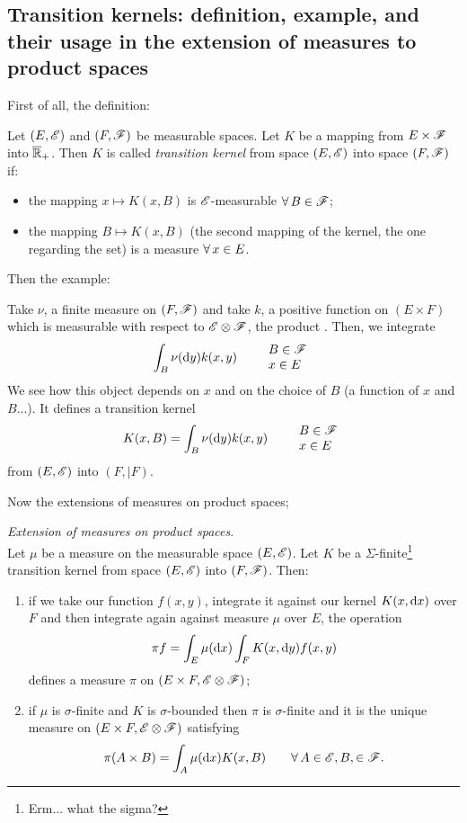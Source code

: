 \documentclass{report}
\begin{document}
\subsection{Transition kernels: definition, example, and their usage in the extension of measures to
product spaces}
First of all, the definition:
\begin{definition}
	Let $(E,\mathscr{E})$ and $(F,\mathscr{F})$ be measurable spaces. Let $K$ be a mapping from $E\times\mathscr{F}$ into $\overline{\mathbb{R}}_+$. Then $K$ is called \emph{transition kernel} from space $(E,\mathscr{E})$ into space $(F,\mathscr{F})$ if:
	\begin{itemize}
		\item the mapping $x\mapsto K(x,B)$ is $\mathscr{E}$-measurable $\forall\, B\in\mathscr{F}$;
		\item the mapping $B\mapsto K(x,B)$ (the second mapping of the kernel, the one regarding the set) is a measure $\forall\, x\in E$.
	\end{itemize}
\end{definition}
Then the example:
\begin{example}
	Take $\nu$, a finite measure on $(F,\mathscr{F})$ and take $k$, a positive function on $(E\times F)$ which is measurable with respect to $\mathscr{E}\otimes\mathscr{F}$, the product \sa{}. Then, we integrate
	\[\int_B\nu(\mathop{}\!\mathrm{d} y)k(x,y)\qquad\begin{array}{l}
		B\in\mathscr{F}\\
		x\in E
	\end{array}\]
	We see how this object depends on $x$ and on the choice of $B$ (a function of $x$ and $B$...). It defines a transition kernel
	\[K(x,B)=\int_B\nu(\mathop{}\!\mathrm{d} y)k(x,y)\qquad\begin{array}{l}
		B\in\mathscr{F}\\
		x\in E
	\end{array}\]
	from $(E,\mathscr{E})$ into $(F,|F)$.
\end{example}
Now the extensions of measures on product spaces;
\begin{theorem}
		\emph{Extension of measures on product spaces}.\\
	Let $\mu$ be a measure on the measurable space $(E,\mathscr{E})$. Let $K$ be a $\Sigma$-finite\footnote{Erm... what the sigma?} transition kernel from space $(E,\mathscr{E})$ into $(F,\mathscr{F})$. Then:
	\begin{enumerate}[\circnum]
		\item if we take our function $f(x,y)$, integrate it against our kernel $K(x,\mathop{}\!\mathrm{d} x)$ over $F$ and then integrate again against measure $\mu$ over $E$, the operation 
		\[\pi f=\int_E\mu(\mathop{}\!\mathrm{d} x)\int_FK(x,\mathop{}\!\mathrm{d} y)f(x,y)\]
		defines a measure $\pi$ on $(E\times F,\mathscr{E}\otimes\mathscr{F})$;
		\item if $\mu$ is $\sigma$-finite and $K$ is $\sigma$-bounded then $\pi$ is $\sigma$-finite and it is the unique measure on $(E\times F,\mathscr{E}\otimes\mathscr{F})$ satisfying
		\[\pi(A\times B)=\int_A\mu(\mathop{}\!\mathrm{d} x)K(x,B)\qquad\forall\, A\in\mathscr{E},B,\in\mathscr{F}.\]
	\end{enumerate}
\end{theorem}
\end{document}
